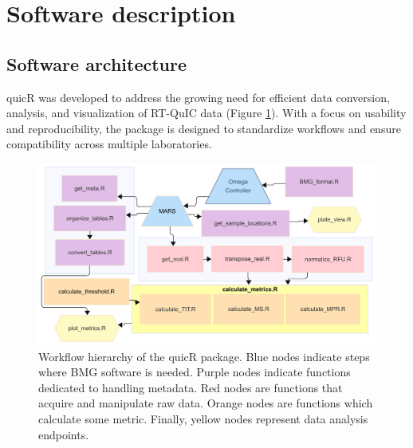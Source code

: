 \documentclass[preprint,12pt,a4paper]{elsarticle}
\begin{document}

    \section{Software description}
        \subsection{Software architecture}
            quicR was developed to address the growing need for efficient data conversion, analysis, and visualization of RT-QuIC data (Figure \ref{fig:workflow}). With a focus on usability and reproducibility, the package is designed to standardize workflows and ensure compatibility across multiple laboratories. 
            \begin{figure}[ht]
                \centering
                \includegraphics[width=\textwidth]{images/workflow.png}
                \caption{Workflow hierarchy of the quicR package. Blue nodes indicate steps where BMG software is needed. Purple nodes indicate functions dedicated to handling metadata. Red nodes are functions that acquire and manipulate raw data. Orange nodes are functions which calculate some metric. Finally, yellow nodes represent data analysis endpoints.}
                \label{fig:workflow}
            \end{figure}
\end{document}
